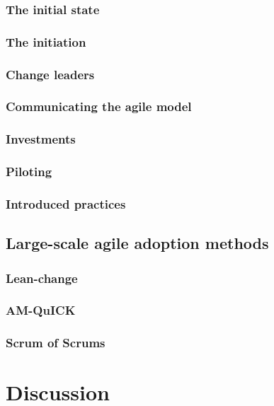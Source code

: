 \documentclass{article}
\begin{document}
\subsubsection{The initial state}

\subsubsection{The initiation}

\subsubsection{Change leaders}

\subsubsection{Communicating the agile model}

\subsubsection{Investments}

\subsubsection{Piloting}

\subsubsection{Introduced practices}

\subsection{Large-scale agile adoption methods}

\subsubsection{Lean-change}

\subsubsection{AM-QuICK}

\subsubsection{Scrum of Scrums}



\section{Discussion}

\end{document}
